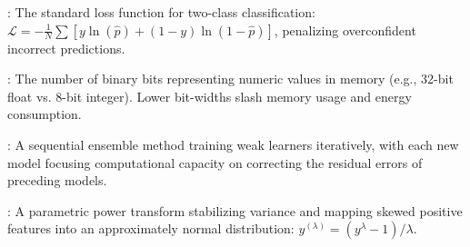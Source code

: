 \begin{description}[leftmargin=!,labelwidth=4.5cm,itemsep=1.5ex]
\item[\textbf{Binary Cross-Entropy}\hfill \textnormal{\sffamily\scriptsize\color{keyideablue}[Deep Learning]}]: The standard loss function for two-class classification: $\mathcal{L} = -\frac{1}{N} \sum [y \ln(\hat{p}) + (1-y) \ln(1-\hat{p})]$, penalizing overconfident incorrect predictions.
\item[\textbf{Bit-width}\hfill \textnormal{\sffamily\scriptsize\color{keyideablue}[TinyML \& Hardware]}]: The number of binary bits representing numeric values in memory (e.g., 32-bit float vs. 8-bit integer). Lower bit-widths slash memory usage and energy consumption.
\item[\textbf{Boosting}\hfill \textnormal{\sffamily\scriptsize\color{keyideablue}[Classical ML]}]: A sequential ensemble method training weak learners iteratively, with each new model focusing computational capacity on correcting the residual errors of preceding models.
\item[\textbf{Box-Cox Transformation}\hfill \textnormal{\sffamily\scriptsize\color{keyideablue}[Data Engineering]}]: A parametric power transform stabilizing variance and mapping skewed positive features into an approximately normal distribution: $y^{(\lambda)} = (y^\lambda - 1)/\lambda$.
\end{description}

